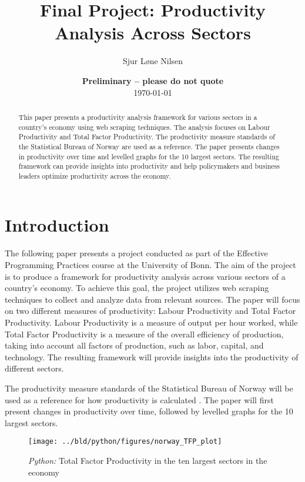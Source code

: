 \documentclass[11pt, a4paper, leqno]{article}
\begin{document}
\title{Final Project: Productivity Analysis Across Sectors}

\author{Sjur Løne Nilsen}

\date{
    {\bf Preliminary -- please do not quote}
    \\[1ex]
    \today
}

\maketitle


\begin{abstract}
    This paper presents a productivity analysis framework for various sectors in a country's 
    economy using web scraping techniques. The analysis focuses on Labour Productivity and 
    Total Factor Productivity. The productivity measure standards of the Statistical Bureau 
    of Norway are used as a reference. The paper presents changes in productivity over time 
    and levelled graphs for the 10 largest sectors. The resulting framework can provide 
    insights into productivity and help policymakers and business leaders optimize productivity 
    across the economy.
\end{abstract}

\clearpage


\section{Introduction} %
\label{sec:introduction}

The following paper presents a project conducted as part of the Effective Programming Practices 
course at the University of Bonn. The aim of the project is to produce a framework for 
productivity analysis across various sectors of a country's economy. To achieve this goal, the 
project utilizes web scraping techniques to collect and analyze data from relevant sources. The
 paper will focus on two different measures of productivity: Labour Productivity and Total 
 Factor Productivity. Labour Productivity is a measure of output per hour worked, while Total 
 Factor Productivity is a measure of the overall efficiency of production, taking into account 
 all factors of production, such as labor, capital, and technology. The resulting framework 
 will provide insights into the productivity of different sectors.

The productivity measure standards of the Statistical Bureau of Norway will be used as a 
reference for how productivity is calculated \cite{ssb_norway}. The paper will first present 
changes in productivity over time, followed by levelled graphs for the 10 largest sectors.



\begin{figure}[H]

    \centering
    \texttt{[image: ../bld/python/figures/norway\_TFP\_plot]}

    \caption{\emph{Python:} Total Factor Productivity in the ten largest sectors in the economy}
    \label{fig:python-predictions}

\end{figure}
\end{document}
